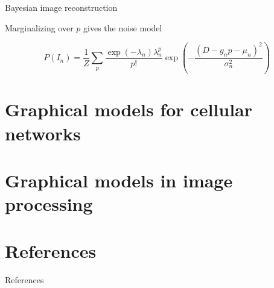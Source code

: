 \documentclass{beamer}					%
\begin{document}
\begin{frame}{Bayesian image reconstruction}

Marginalizing over $p$ gives the noise model

\begin{equation*}
P(I_{n}) = \frac{1}{Z}\sum_{p}\frac{\exp\left({-\lambda_{n}}\right)\lambda_{n}^{p}}{p!}\exp\left(-\frac{(D-g_{n}p-\mu_{n})^{2}}{\sigma_{n}^{2}}\right)
\end{equation*}



\end{frame}




\section{Graphical models for cellular networks}




\section{Graphical models in image processing}



\section{References}

\begin{frame}[allowframebreaks]{References}
	\tiny
	
\end{frame}
\end{document}
